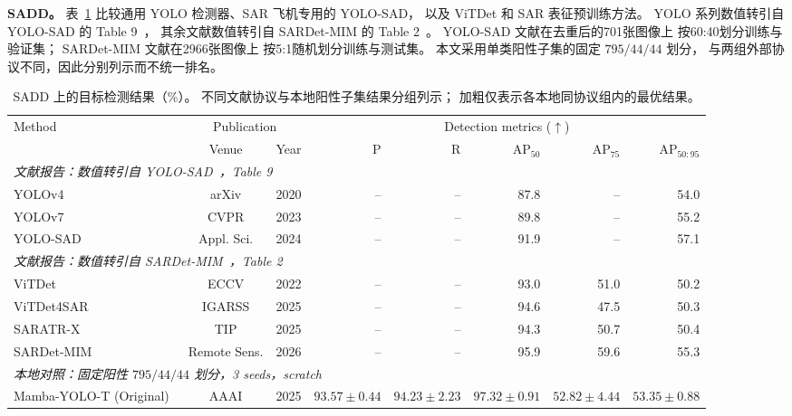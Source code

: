\textbf{SADD。}
表~\ref{tab:sadd_detection_comparison}
比较通用 YOLO 检测器、SAR 飞机专用的 YOLO-SAD，
以及 ViTDet 和 SAR 表征预训练方法。
YOLO 系列数值转引自 YOLO-SAD 的 Table 9~\cite{yolosad2024}，
其余文献数值转引自 SARDet-MIM 的 Table 2~\cite{sardetmim2026}。
YOLO-SAD 文献在去重后的701张图像上
按60:40划分训练与验证集；
SARDet-MIM 文献在2966张图像上
按5:1随机划分训练与测试集。
本文采用单类阳性子集的固定 $795/44/44$ 划分，
与两组外部协议不同，因此分别列示而不统一排名。

\begin{table}[!t]
\centering
\small
\setlength{\tabcolsep}{3.5pt}
\renewcommand{\arraystretch}{1.10}
\caption{SADD 上的目标检测结果（\%）。
不同文献协议与本地阳性子集结果分组列示；
加粗仅表示各本地同协议组内的最优结果。}
\label{tab:sadd_detection_comparison}
\begin{tabular*}{\textwidth}{@{\extracolsep{\fill}}lccrrrrr}
\toprule
\multirow{2}{*}{Method}
& \multicolumn{2}{c}{Publication}
& \multicolumn{5}{c}{Detection metrics ($\uparrow$)} \\
\cmidrule(lr){2-3}\cmidrule(lr){4-8}
& Venue & Year & P & R
& AP$_{50}$ & AP$_{75}$ & AP$_{50:95}$ \\
\midrule
\multicolumn{8}{l}{\textit{文献报告：数值转引自 YOLO-SAD~\cite{yolosad2024}，Table 9}} \\
YOLOv4~\cite{yolov42020}
& arXiv & 2020
& -- & -- & 87.8 & -- & 54.0 \\
YOLOv7~\cite{yolov72023}
& CVPR & 2023
& -- & -- & 89.8 & -- & 55.2 \\
YOLO-SAD~\cite{yolosad2024}
& Appl. Sci. & 2024
& -- & -- & 91.9 & -- & 57.1 \\
\midrule
\multicolumn{8}{l}{\textit{文献报告：数值转引自 SARDet-MIM~\cite{sardetmim2026}，Table 2}} \\
ViTDet~\cite{vitdet2022}
& ECCV & 2022
& -- & -- & 93.0 & 51.0 & 50.2 \\
ViTDet4SAR~\cite{vitdet4sar2025}
& IGARSS & 2025
& -- & -- & 94.6 & 47.5 & 50.3 \\
SARATR-X~\cite{saratrx2025}
& TIP & 2025
& -- & -- & 94.3 & 50.7 & 50.4 \\
SARDet-MIM~\cite{sardetmim2026}
& Remote Sens. & 2026
& -- & -- & 95.9 & 59.6 & 55.3 \\
\midrule
\multicolumn{8}{l}{\textit{本地对照：固定阳性 $795/44/44$ 划分，3 seeds，scratch}} \\
Mamba-YOLO-T (Original)~\cite{mambayolo2024}
& AAAI & 2025
& $93.57\pm0.44$ & $\mathbf{94.23\pm2.23}$ & $97.32\pm0.91$ & $\mathbf{52.82\pm4.44}$ & $\mathbf{53.35\pm0.88}$ \\

\end{tabular*}
\end{table}
